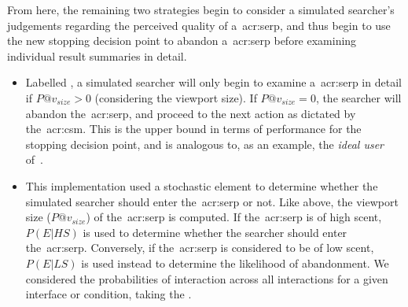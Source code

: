 From here, the remaining two strategies begin to consider a simulated searcher's judgements regarding the perceived quality of a~\gls{acr:serp}, and thus begin to use the new stopping decision point to abandon a~\gls{acr:serp} before examining individual result summaries in detail.

\begin{itemize}
    \item{ Labelled , a simulated searcher will only begin to examine a~\gls{acr:serp} in detail if $P@v_{size} > 0$ (considering the viewport size). If $P@v_{size} = 0$, the searcher will abandon the~\gls{acr:serp}, and proceed to the next action as dictated by the~\gls{acr:csm}. This is the upper bound in terms of performance for the stopping decision point, and is analogous to, as an example, the \emph{ideal user} of~\cite{hagen2016simulating_users}.}
    
    \item{ This implementation used a stochastic element to determine whether the simulated searcher should enter the~\gls{acr:serp} or not. Like above, the viewport size ($P@v_{size}$) of the~\gls{acr:serp} is computed. If the~\gls{acr:serp} is of high scent, $P(E|HS)$ is used to determine whether the searcher should enter the~\gls{acr:serp}. Conversely, if the~\gls{acr:serp} is considered to be of low scent, $P(E|LS)$ is used instead to determine the likelihood of abandonment. We considered the probabilities of interaction across all interactions for a given interface or condition, taking the .}
    
%
\end{itemize}

